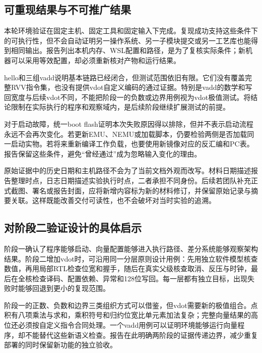 \subsection{可重现结果与不可推广结果}


本轮环境验证在固定主机、固定工具和固定输入下完成。复现成功支持这些条件下的可执行性，但不会自动证明另一操作系统、另一子模块提交或另一工艺库也能得到相同输出。报告列出本机内存、WSL配置和路径，是为了复核实际条件；新机器可以采用等效配置，却必须重新核对产物和运行结果。\par


hello和三组vadd说明基本链路已经闭合，但测试范围依旧有限。它们没有覆盖完整RVV指令集，也没有提供vdot自定义编码的通过证据。特别是vadd的数学和写回宽度与后续vdot不同，不能把阶段一的负数或边界用例视为vdot极值测试。将结论限制在实际执行的程序和观察域内，是后续阶段继续扩展测试的前提。\par


对于启动故障，统一boot flash证明本次失败原因得以排除，但并不表示启动流程永远不会再次变化。若更新EMU、NEMU或加载脚本，仍要检验两侧是否加载同一启动实物。若将来重新编译工作负载，也要使用新镜像对应的反汇编和PC表。报告保留这些条件，避免“曾经通过”成为忽略输入变化的理由。\par


原始证据中的历史日期和主机路径不会为了当前文档外观而改写。材料日期描述报告整理时点，日志日期描述实验执行时点，二者承担不同身份。后续若团队补充正式截图、署名或报告封面，应将新增内容标为新的材料修订，并保留原始记录与摘要关联。这样既能改善交付可读性，也不会破坏对当时实验的追溯。\par


\subsection{对阶段二验证设计的具体启示}


阶段一确认了程序能够启动、向量配置能够进入执行路径、差分系统能够观察架构结果。阶段二增加vdot时，可沿用同一分层原则设计用例：先用独立软件模型核查数值，再用局部RTL检查位宽和握手，随后在真实父级核查取消、反压与时钟，最后在全核检查译码、配置依赖、异常和128位写回。每一层都有独立目标，出现失败时能够回退到更小的复现范围。\par


阶段一的正数、负数和边界三类组织方式可以借鉴，但vdot需要新的极值组合。点积有八项乘法与求和，乘积符号和归约位宽比单元素加法复杂；完整向量结果的高位还必须按自定义指令合同处理。一个vadd用例可以证明环境能够运行向量程序，却不能替代这些新语义检查。报告在此明确两阶段的证据传递边界，减少重复部署的同时保留新功能的独立验收。\par


